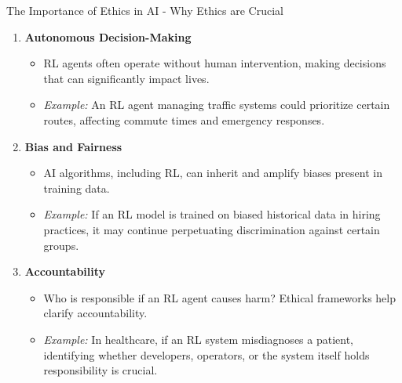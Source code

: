 \documentclass[aspectratio=169]{beamer}
\begin{document}
\begin{frame}[fragile]{The Importance of Ethics in AI - Why Ethics are Crucial}
    \begin{enumerate}
        \item \textbf{Autonomous Decision-Making}
            \begin{itemize}
                \item RL agents often operate without human intervention, making decisions that can significantly impact lives.
                \item \textit{Example:} An RL agent managing traffic systems could prioritize certain routes, affecting commute times and emergency responses.
            \end{itemize}
        
        \item \textbf{Bias and Fairness}
            \begin{itemize}
                \item AI algorithms, including RL, can inherit and amplify biases present in training data.
                \item \textit{Example:} If an RL model is trained on biased historical data in hiring practices, it may continue perpetuating discrimination against certain groups.
            \end{itemize}
        
        \item \textbf{Accountability}
            \begin{itemize}
                \item Who is responsible if an RL agent causes harm? Ethical frameworks help clarify accountability.
                \item \textit{Example:} In healthcare, if an RL system misdiagnoses a patient, identifying whether developers, operators, or the system itself holds responsibility is crucial.
            \end{itemize}
    \end{enumerate}
\end{frame}
\end{document}
